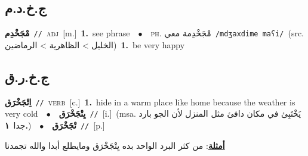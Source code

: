 \documentclass[10pt,a4paper,twoside]{article} %
\begin{document}
\begin{multicols}{2}
{{{{{{{{{\vspace{-3mm}
\subsection*{\color{blue}\foreignlanguage{arabic}{ج.خ.د.م}\color{blue}{}} 

{\setlength\topsep{0pt}\textbf{\foreignlanguage{arabic}{مْجَخْدِم}}\ {\color{gray}\texttt{//}\color{black}}\ \textsc{adj}\ [m.]\ \textbf{1.}~see phrase\ \ $\bullet$\ \ \textsc{ph.} \color{gray} \foreignlanguage{arabic}{مْجَخْدِمة معي}\color{black}\ {\color{gray}\texttt{/{\sffamily mdʒaxdime maʕi}/}\color{black}}\ \color{gray}(src. \foreignlanguage{arabic}{الخليل > الظاهرية > الرماضين})\color{black}\ \textbf{1.}~be very happy\ 

\vspace{-3mm}
\subsection*{\color{blue}\foreignlanguage{arabic}{ج.خ.ر.ق}\color{blue}{}} 

{\setlength\topsep{0pt}\textbf{\foreignlanguage{arabic}{اِتْجَخْرَق}}\ {\color{gray}\texttt{//}\color{black}}\ \textsc{verb}\ [c.]\ \textbf{1.}~hide in a warm place like home because the weather is very cold\ \ $\bullet$\ \ \setlength\topsep{0pt}\textbf{\foreignlanguage{arabic}{يِتْجَخْرَق}}\ {\color{gray}\texttt{//}\color{black}}\ [i.]\ \color{gray}(msa. \foreignlanguage{arabic}{يَخْتَبِئ في مكان دافئ مثل المنزل لأن الجو بارد جدا}~\foreignlanguage{arabic}{\textbf{١.}})\color{black}\ \ $\bullet$\ \ \setlength\topsep{0pt}\textbf{\foreignlanguage{arabic}{تْجَخْرَق}}\ {\color{gray}\texttt{//}\color{black}}\ [p.]\  \begin{flushright}\color{gray}\foreignlanguage{arabic}{\textbf{\underline{\foreignlanguage{arabic}{أمثلة}}}: من كثر البرد الواحد بده يِتْجَخْرَق ومايطلع أبدا والله تجمدنا}\end{flushright}\color{black}} \vspace{2mm}

}}}}}}}}}}
\end{multicols}
\end{document}
